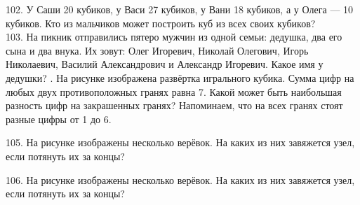 \documentclass[12pt]{article}
\begin{document}
102. У Саши 20 кубиков, у Васи 27 кубиков, у Вани 18 кубиков, а у Олега --- 10 кубиков. Кто из мальчиков может построить куб из всех своих кубиков?\\
103. На пикник отправились пятеро мужчин из одной семьи: дедушка, два его сына и два внука. Их зовут: Олег Игоревич, Николай Олегович, Игорь Николаевич, Василий Александрович и Александр Игоревич. Какое имя у дедушки?\newpage
{}. На рисунке изображена развёртка игрального кубика. Сумма цифр на любых двух противоположных гранях равна 7. Какой может быть наибольшая разность цифр на закрашенных гранях? Напоминаем, что на всех гранях стоят разные цифры от 1 до 6.
\begin{center}
\begin{figure}[ht!]
\end{figure}
\end{center}
105. На рисунке изображены несколько верёвок. На каких из них завяжется узел, если потянуть их за концы?
\begin{center}
\begin{figure}[ht!]
\end{figure}
\end{center}
106. На рисунке изображены несколько верёвок. На каких из них завяжется узел, если потянуть их за концы?
\begin{center}
\begin{figure}[ht!]
\end{figure}
\end{center}
\end{document}
